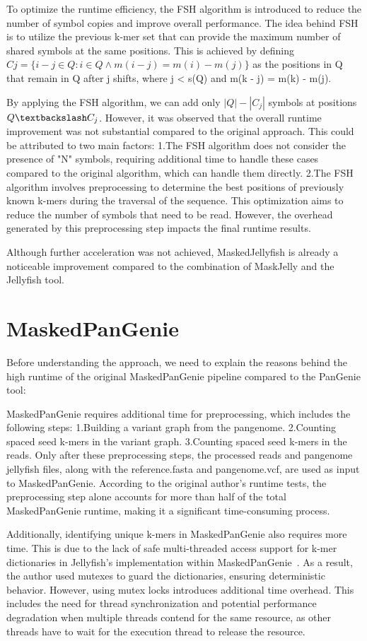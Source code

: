 \documentclass{PHlab-thesis}
\begin{document}
To optimize the runtime efficiency, the FSH algorithm is introduced to reduce the number of symbol copies and improve overall performance. The idea behind FSH is to utilize the previous k-mer set that can provide the maximum number of shared symbols at the same positions. This is achieved by defining $Cj = \{i-j\in Q:i\in Q \wedge m(i-j) = m(i) - m(j) \}$ as the positions in Q that remain in Q after j shifts, where j < s(Q) and m(k - j) = m(k) - m(j).

By applying the FSH algorithm, we can add only $\left|Q\right|-\left|C_j\right|$ symbols at positions $Q\textbackslash C_j$. However, it was observed that the overall runtime improvement was not substantial compared to the original approach. This could be attributed to two main factors: 1.The FSH algorithm does not consider the presence of "N" symbols, requiring additional time to handle these cases compared to the original algorithm, which can handle them directly. 2.The FSH algorithm involves preprocessing to determine the best positions of previously known k-mers during the traversal of the sequence. This optimization aims to reduce the number of symbols that need to be read. However, the overhead generated by this preprocessing step impacts the final runtime results.

Although further acceleration was not achieved, MaskedJellyfish is already a noticeable improvement compared to the combination of MaskJelly and the Jellyfish tool.
\section{MaskedPanGenie}

Before understanding the approach, we need to explain the reasons behind the high runtime of the original MaskedPanGenie pipeline compared to the PanGenie tool:

MaskedPanGenie requires additional time for preprocessing, which includes the following steps:
1.Building a variant graph from the pangenome. 2.Counting spaced seed k-mers in the variant graph. 3.Counting spaced seed k-mers in the reads. Only after these preprocessing steps, the processed reads and pangenome jellyfish files, along with the reference.fasta and pangenome.vcf, are used as input to MaskedPanGenie. According to the original author's runtime tests, the preprocessing step alone accounts for more than half of the total MaskedPanGenie runtime, making it a significant time-consuming process.

Additionally, identifying unique k-mers in MaskedPanGenie also requires more time. This is due to the lack of safe multi-threaded access support for k-mer dictionaries in Jellyfish's implementation within MaskedPanGenie~\cite{haimo2022issue}. As a result, the author used mutexes to guard the dictionaries, ensuring deterministic behavior. However, using mutex locks introduces additional time overhead. This includes the need for thread synchronization and potential performance degradation when multiple threads contend for the same resource, as other threads have to wait for the execution thread to release the resource.
\end{document}
